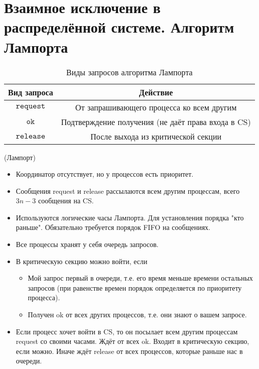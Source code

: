 \section{Взаимное исключение в распределённой системе. Алгоритм Лампорта}

\begin{table}[!ht]
    \centering
    \begin{tabular}{|c|c|} \hline
        Вид запроса & Действие \\ \hline
        $\texttt{request}$ & От запрашивающего процесса ко всем другим\\ \hline
        $\texttt{ok}$ & Подтверждение получения (не даёт права входа в CS) \\ \hline
        $\texttt{release}$ & После выхода из критической секции \\\hline
    \end{tabular}
    \caption{Виды запросов алгоритма Лампорта}
\end{table}

\begin{algorithm}(Лампорт)
\begin{itemize}
    \item Координатор отсутствует, но у процессов есть приоритет.
    \item Сообщения request и release рассылаются всем другим процессам, всего $3n-3$ сообщения на CS.
    \item Используются логические часы Лампорта.
        Для установления порядка "кто раньше".
        Обязательно требуется порядок FIFO на сообщениях.
    \item Все процессы хранят у себя очередь запросов.
    \item В критическую секцию можно войти, если
        \begin{itemize}
            \item Мой запрос первый в очереди, т.е. его время меньше времени 
                остальных запросов (при равенстве времен порядок определяется 
                по приоритету процесса).
            \item Получен ok от всех других процессов, т.е. они знают о вашем запросе.
        \end{itemize}
    \item Если процесс хочет войти в CS, то он посылает всем другим процессам request со
        своими часами. Ждёт от всех ok. Входит в критическую секцию, если можно.
        Иначе ждёт release от всех процессов, которые раньше нас в очереди.
\end{itemize}
\end{algorithm}


